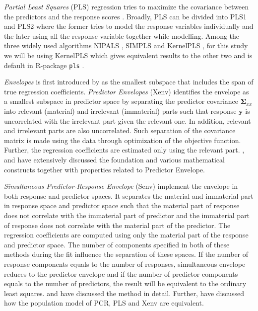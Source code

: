 \documentclass[12pt,3p,authoryear]{elsarticle}
\begin{document}
\emph{Partial Least Squares} (PLS) regression tries to maximize the covariance between the predictors and the response scores \citep{DeJong1993}. Broadly, PLS can be divided into PLS1 and PLS2 where the former tries to model the response variables individually and the later using all the response variable together while modelling. Among the three widely used algorithms NIPALS \citep{wold75nipals}, SIMPLS \citep{DeJong1993} and KernelPLS \citep{Lindgren_1993}, for this study we will be using KernelPLS which gives equivalent results to the other two and is default in R-package \texttt{pls} \citep{mevik07_thepl}.

\emph{Envelopes} is first introduced by \citep{Cook2007a} as the smallest subspace that includes the span of true regression coefficients. \emph{Predictor Envelopes} (Xenv) identifies the envelope as a smallest subspace in predictor space by separating the predictor covariance \(\boldsymbol{\Sigma}_{xx}\) into relevant (material) and irrelevant (immaterial) parts such that response \(\mathbf{y}\) is uncorrelated with the irrelevant part given the relevant one. In addition, relevant and irrelevant parts are also uncorrelated. Such separation of the covariance matrix is made using the data through optimization of the objective function. Further, the regression coefficients are estimated only using the relevant part. \citet{cook2010envelope}, \citet{cook2013envelopes} and \citet{cook2018envelope} have extensively discussed the foundation and various mathematical constructs together with properties related to Predictor Envelope.

\emph{Simultaneous Predictor-Response Envelope} (Senv) implement the envelope in both response and predictor spaces. It separates the material and immaterial part in response space and predictor space such that the material part of response does not correlate with the immaterial part of predictor and the immaterial part of response does not correlate with the material part of the predictor. The regression coefficients are computed using only the material part of the response and predictor space. The number of components specified in both of these methods during the fit influence the separation of these spaces. If the number of response components equals to the number of responses, simultaneous envelope reduces to the predictor envelope and if the number of predictor components equals to the number of predictors, the result will be equivalent to the ordinary least squares. \citet{cook2015simultaneous} and \citet{cook2018envelope} have discussed the method in detail. Further, \citet{helland2016algorithms} have discussed how the population model of PCR, PLS and Xenv are equivalent.
\end{document}
